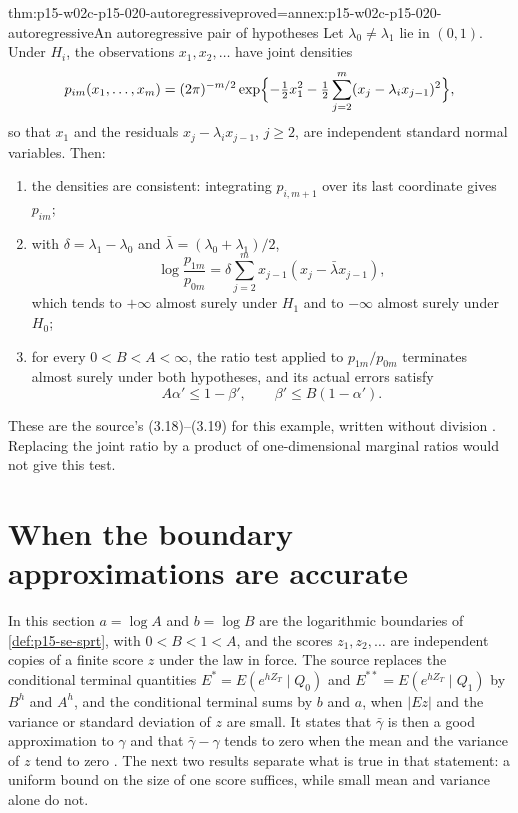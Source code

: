 \begin{hbtheorem}{thm:p15-w02c-p15-020-autoregressive}{proved=annex:p15-w02c-p15-020-autoregressive}{An autoregressive pair of hypotheses}
Let \(\lambda_0\neq\lambda_1\) lie in \((0,1)\). Under \(H_i\), the
observations \(x_1,x_2,\ldots\) have joint densities
\[
 p_{im}(x_1,\ldots,x_m)=(2\pi)^{-m/2}
 \exp\Bigl\{-\tfrac12x_1^2-\tfrac12\sum_{j=2}^m(x_j-\lambda_ix_{j-1})^2\Bigr\},
\]
so that \(x_1\) and the residuals \(x_j-\lambda_ix_{j-1}\), \(j\geq2\),
are independent standard normal variables. Then:
\begin{enumerate}
\item the densities are consistent: integrating \(p_{i,m+1}\) over its
 last coordinate gives \(p_{im}\);
\item with \(\delta=\lambda_1-\lambda_0\) and
 \(\bar\lambda=(\lambda_0+\lambda_1)/2\),
 \[
  \log\frac{p_{1m}}{p_{0m}}
  =\delta\sum_{j=2}^mx_{j-1}(x_j-\bar\lambda x_{j-1}),
 \]
 which tends to \(+\infty\) almost surely under \(H_1\) and to
 \(-\infty\) almost surely under \(H_0\);
\item for every \(0<B<A<\infty\), the ratio test applied to
 \(p_{1m}/p_{0m}\) terminates almost surely under both hypotheses, and
 its actual errors satisfy
 \[
  A\alpha'\leq1-\beta',\qquad \beta'\leq B(1-\alpha').
 \]
\end{enumerate}
These are the source's (3.18)--(3.19) for this example, written
without division
\cite[Section 3.2, p.~130]{Wald1945SequentialTests}. Replacing the
joint ratio by a product of one-dimensional marginal ratios would not
give this test.
\end{hbtheorem}
\section{When the boundary approximations are accurate}
\label{sec:p15-w02c-p15-020-regimes}

In this section \(a=\log A\) and \(b=\log B\) are the logarithmic
boundaries of \cref{def:p15-se-sprt}, with \(0<B<1<A\), and the scores
\(z_1,z_2,\ldots\) are independent copies of a finite score \(z\) under
the law in force. The source replaces the conditional terminal
quantities \(E^*=E(e^{hZ_T}\mid Q_0)\) and \(E^{**}=E(e^{hZ_T}\mid Q_1)\)
by \(B^h\) and \(A^h\), and the conditional terminal sums by \(b\) and
\(a\), when \(|Ez|\) and the variance or standard deviation of \(z\)
are small. It states that \(\bar\gamma\) is then a good approximation
to \(\gamma\) and that \(\bar\gamma-\gamma\) tends to zero when the
mean and the variance of \(z\) tend to zero
\cite[Section 3.4, p.~135; Section 4.1, p.~143]{Wald1945SequentialTests}.
The next two results separate what is true in that statement: a uniform
bound on the size of one score suffices, while small mean and variance
alone do not.

